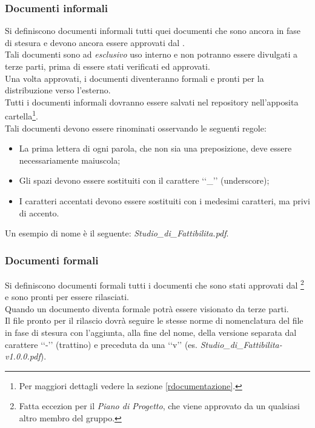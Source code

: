 \subsubsection{Documenti informali}
\label{documentiinf}
Si definiscono documenti informali tutti quei documenti che sono ancora in fase di stesura e devono ancora essere approvati dal \projectManager{}.
\\Tali documenti sono ad \emph{esclusivo} uso interno e non potranno essere divulgati a terze parti, prima di essere stati verificati ed approvati.
\\Una volta approvati, i documenti diventeranno formali e pronti per la distribuzione verso l'esterno.
\\Tutti i documenti informali dovranno essere salvati nel repository\glossario{} nell'apposita cartella\footnote{Per maggiori dettagli vedere la sezione \ref{rdocumentazione}.}.
\\Tali documenti devono essere rinominati osservando le seguenti regole: 
\begin{itemize}
\item La prima lettera di ogni parola, che non sia una preposizione, deve essere necessariamente maiuscola;
\item Gli spazi devono essere sostituiti con il carattere \lq\lq{}\_{}\rq\rq{} (underscore);
\item I caratteri accentati devono essere sostituiti con i medesimi caratteri, ma privi di accento.
\end{itemize}
Un esempio di nome è il seguente: \emph{Studio\_di\_Fattibilita.pdf}.

\subsubsection{Documenti formali}
\label{documentiformali}
Si definiscono documenti formali tutti i documenti che sono stati approvati dal \projectManager{}\footnote{Fatta eccezion per il \emph{Piano di Progetto}, che viene approvato da un qualsiasi altro membro del gruppo.} e sono pronti per essere rilasciati.
\\Quando un documento diventa formale potrà essere visionato da terze parti.
\\Il file pronto per il rilascio dovrà seguire le stesse norme di nomenclatura del file in fase di stesura con l’aggiunta, alla fine del nome, della versione separata dal carattere \lq\lq{}-\rq\rq{} (trattino) e preceduta da una \lq\lq{}v\rq\rq{} (es. \emph{Studio\_di\_Fattibilita-v1.0.0.pdf}).

